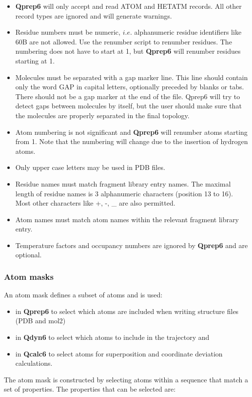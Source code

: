 \documentclass[a4paper,11pt]{article}
\begin{document}
\begin{itemize}
\item  \textbf{Qprep6}  will  only  accept and  read  ATOM  and  HETATM
records. All other record types are ignored and will generate warnings.
\item  Residue numbers  must be  numeric, $i.e.$  alphanumeric residue
identifiers  like 60B  are not  allowed.  Use  the renumber  script to
renumber residues.   The numbering does  not have  to start at  1, but
\textbf{Qprep6} will renumber residues starting at 1.
\item Molecules  must be separated with  a gap marker line.  This line
should  contain  only the  word  GAP  in capital  letters,  optionally
preceded by blanks  or tabs. There should  not be a gap  marker at the
end of the file. Qprep6 will try to detect gaps between molecules
by itself, but the user should make sure that the molecules are properly
separated in the final topology.
\item  Atom  numbering  is  not significant  and  \textbf{Qprep6}  will
renumber atoms  starting from 1.  Note that the numbering  will change
due to the insertion of hydrogen atoms.
\item Only upper case letters may be used in PDB files.
\item  Residue names  must  match fragment  library  entry names.  The
maximal length of residue names is 3 alphanumeric characters (position
13 to 16). Most other characters like +, -, {\_} are also permitted.
\item Atom  names must match  atom names within the  relevant fragment
library entry.
\item  Temperature  factors  and  occupancy  numbers  are  ignored  by
\textbf{Qprep6} and are optional.
\end{itemize}

\subsubsection{Atom masks}\label{subsubsec:atom_masks}
An atom mask defines a subset of atoms and is used:
\begin{itemize}
\item in \textbf{Qprep6} to select which atoms are included when writing
structure files (PDB and mol2)
\item in \textbf{Qdyn6} to select which atoms
to include in the trajectory and
\item in \textbf{Qcalc6} to select atoms
for superposition and coordinate deviation calculations.
\end{itemize}
The atom mask is constructed by selecting atoms within a sequence
that match a set of properties. The properties that can be
selected are:
\end{document}
